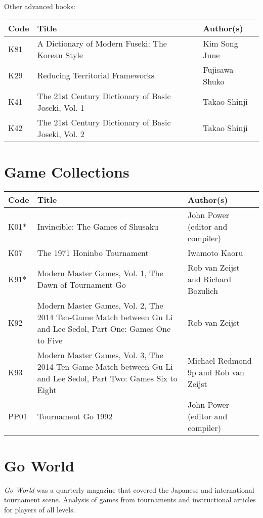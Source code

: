 Other advanced books:

\begin{longtable}{l|p{55mm}|p{55mm}} 
    \hline
    \textbf{Code} & \textbf{Title} & \textbf{Author(s)} \\
    \hline \hline
    K81 & A Dictionary of Modern Fuseki: The Korean Style & Kim Song June \\
    \hline
    K29 & Reducing Territorial Frameworks & Fujisawa Shuko \\
    \hline
    K41 & The 21st Century Dictionary of Basic Joseki, Vol. 1 & Takao Shinji \\
    \hline
    K42 & The 21st Century Dictionary of Basic Joseki, Vol. 2 & Takao Shinji \\
    \hline
\end{longtable}

\section{Game Collections}

\begin{longtable}{l|p{55mm}|p{55mm}} 
    \hline
    \textbf{Code} & \textbf{Title} & \textbf{Author(s)} \\
    \hline \hline
    K01* & Invincible: The Games of Shusaku & John Power (editor and compiler) \\
    \hline
    K07 & The 1971 Honinbo Tournament & Iwamoto Kaoru \\
    \hline
    K91* & Modern Master Games, Vol. 1, The Dawn of Tournament Go & Rob van Zeijst and Richard Bozulich \\
    \hline
    K92 & Modern Master Games, Vol. 2, The 2014 Ten-Game Match between Gu Li and Lee Sedol, Part One: Games One to Five & Rob van Zeijst \\
    \hline
    K93 & Modern Master Games, Vol. 3, The 2014 Ten-Game Match between Gu Li and Lee Sedol, Part Two: Games Six to Eight & Michael Redmond 9p and Rob van Zeijst \\
    \hline
    PP01 & Tournament Go 1992 & John Power (editor and compiler) \\
    \hline
\end{longtable}

\section{Go World}

\emph{Go World} was a quarterly magazine that covered the Japanese and international tournament scene. Analysis of games from tournaments and instructional articles for players of all levels.

